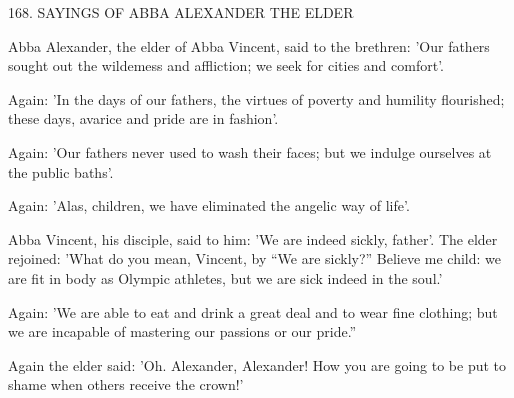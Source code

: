 168. SAYINGS OF ABBA ALEXANDER THE ELDER

Abba Alexander, the elder of Abba Vincent, said to the brethren:
'Our fathers sought out the wildemess and affliction; we seek for
cities and comfort'.

Again: 'In the days of our fathers, the virtues of poverty and
humility flourished; these days, avarice and pride are in fashion'.

Again: 'Our fathers never used to wash their faces; but we
indulge ourselves at the public baths'.

Again: 'Alas, children, we have eliminated the angelic way of
life'.

Abba Vincent, his disciple, said to him: 'We are indeed sickly,
father'. The elder rejoined: 'What do you mean, Vincent, by “We
are sickly?” Believe me child: we are fit in body as Olympic athletes,
but we are sick indeed in the soul.'

Again: 'We are able to eat and drink a great deal and to wear
fine clothing; but we are incapable of mastering our passions or our
pride.”

Again the elder said: 'Oh. Alexander, Alexander! How you are
going to be put to shame when others receive the crown!'

